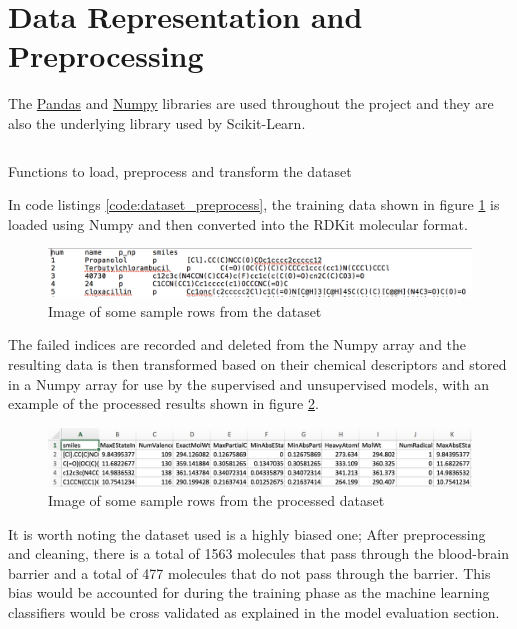 \documentclass[a4paper,12pt]{report}
\begin{document}
	\section{Data Representation and Preprocessing}
	The \href{http://pandas.pydata.org/}{Pandas} and \href{http://www.numpy.org/}{Numpy} libraries are used throughout the project and they are also the underlying library used by Scikit-Learn. 
		\begin{listing}[!htbp]
			\inputminted[breaklines=true,breakautoindent=true,linenos=true]{python}{source_code/dataset.py}
			\caption{Functions to load, preprocess and transform the dataset}
			\label{code:dataset_preprocess}
		\end{listing}
	In code listings \ref{code:dataset_preprocess}, the training data shown in figure \ref{fig:input_dataset} is loaded using Numpy and then converted into the RDKit molecular format. 
		\begin{figure}[H]
			\centering
			\includegraphics[width=\textwidth,scale=1]{images/input_dataset}
			\caption{Image of some sample rows from the dataset}
			\label{fig:input_dataset}
		\end{figure}
	The failed indices are recorded and deleted from the Numpy array and the resulting data is then transformed based on their chemical descriptors and stored in a Numpy array for use by the supervised and unsupervised models, with an example of the processed results shown in figure \ref{fig:processed_dataset}.
		\begin{figure}[H]
			\centering
			\includegraphics[width=\textwidth,scale=1]{images/processed_dataset}
			\caption{Image of some sample rows from the processed dataset}
			\label{fig:processed_dataset}
		\end{figure}
	
	It is worth noting the dataset used is a highly biased one; After preprocessing and cleaning, there is a total of 1563 molecules that pass through the blood-brain barrier and a total of 477 molecules that do not pass through the barrier. This bias would be accounted for during the training phase as the machine learning classifiers would be cross validated as explained in the model evaluation section.
	
\end{document}
